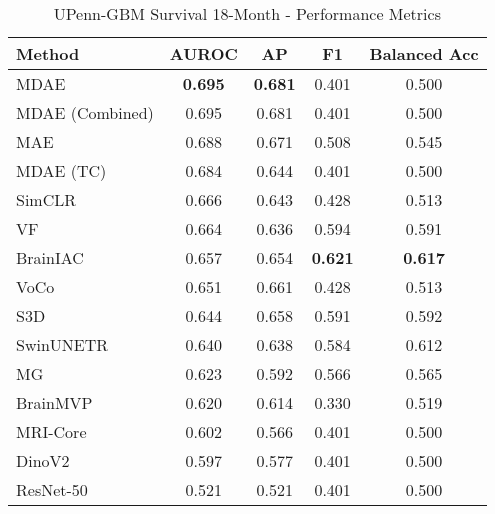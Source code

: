 \begin{table}[ht]
\centering
\caption{UPenn-GBM Survival 18-Month - Performance Metrics}
\label{tab:upenn_gbm_survival_18month}
\begin{tabular}{lcccc}
\toprule
Method & AUROC & AP & F1 & Balanced Acc \\
\midrule
MDAE & \textbf{0.695} & \textbf{0.681} & 0.401 & 0.500 \\
MDAE (Combined) & 0.695 & 0.681 & 0.401 & 0.500 \\
MAE & 0.688 & 0.671 & 0.508 & 0.545 \\
MDAE (TC) & 0.684 & 0.644 & 0.401 & 0.500 \\
SimCLR & 0.666 & 0.643 & 0.428 & 0.513 \\
VF & 0.664 & 0.636 & 0.594 & 0.591 \\
BrainIAC & 0.657 & 0.654 & \textbf{0.621} & \textbf{0.617} \\
VoCo & 0.651 & 0.661 & 0.428 & 0.513 \\
S3D & 0.644 & 0.658 & 0.591 & 0.592 \\
SwinUNETR & 0.640 & 0.638 & 0.584 & 0.612 \\
MG & 0.623 & 0.592 & 0.566 & 0.565 \\
BrainMVP & 0.620 & 0.614 & 0.330 & 0.519 \\
MRI-Core & 0.602 & 0.566 & 0.401 & 0.500 \\
DinoV2 & 0.597 & 0.577 & 0.401 & 0.500 \\
ResNet-50 & 0.521 & 0.521 & 0.401 & 0.500 \\
\bottomrule
\end{tabular}
\end{table}
